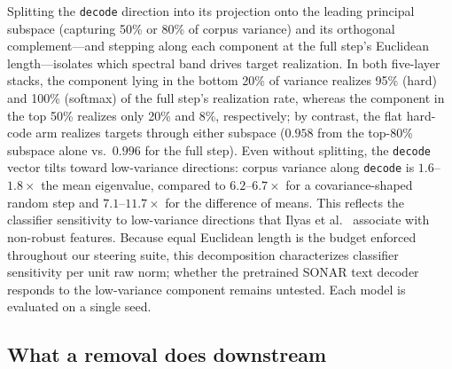 Splitting the \texttt{decode} direction into its projection onto the
leading principal subspace (capturing 50\% or 80\% of corpus variance)
and its orthogonal complement---and stepping along each component at the
full step's Euclidean length---isolates which spectral band drives target
realization. In both five-layer stacks, the component lying in the bottom
20\% of variance realizes 95\% (hard) and 100\% (softmax) of the full
step's realization rate, whereas the component in the top 50\% realizes
only 20\% and 8\%, respectively; by contrast, the flat hard-code arm
realizes targets through either subspace ($0.958$ from the top-80\%
subspace alone vs.\ $0.996$ for the full step). Even without splitting,
the \texttt{decode} vector tilts toward low-variance directions: corpus
variance along \texttt{decode} is $1.6$--$1.8\times$ the mean eigenvalue,
compared to $6.2$--$6.7\times$ for a covariance-shaped random step and
$7.1$--$11.7\times$ for the difference of means. This reflects the
classifier sensitivity to low-variance directions that Ilyas et
al.~\cite{ilyas2019} associate with non-robust features. Because equal
Euclidean length is the budget enforced throughout our steering suite,
this decomposition characterizes classifier sensitivity per unit raw
norm; whether the pretrained SONAR text decoder responds to the
low-variance component remains untested. Each model is evaluated on a
single seed.

\subsection{What a removal does downstream}
\label{sec:removals}

